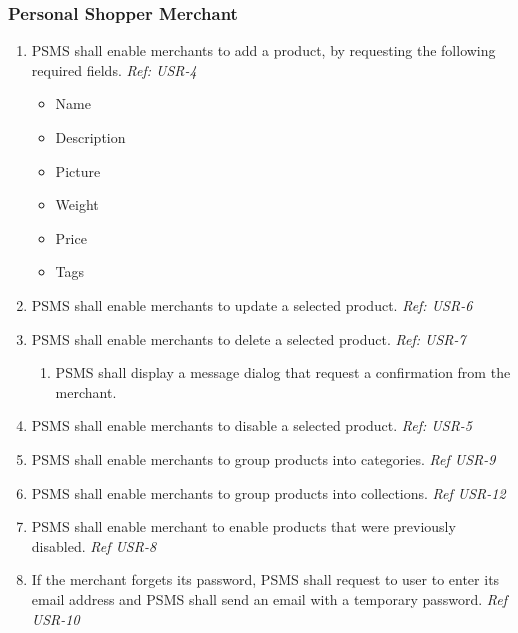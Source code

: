\subsubsection{Personal Shopper Merchant}
\begin{enumerate}[resume, label=SY-\arabic*]
    \item PSMS shall enable merchants to add a product, by requesting the 
    following required fields.
    \newline \textit{Ref: USR-4}
    \begin{itemize}
        \item Name
        \item Description
        \item Picture
        \item Weight
        \item Price 
        \item Tags
    \end{itemize}
    \item PSMS shall enable merchants to update a selected product.
    \newline \textit{Ref: USR-6}
    \item PSMS shall enable merchants to delete a selected product.
    \newline \textit{Ref: USR-7}
    \begin{enumerate}[label=SY-24.\arabic*]
        \item PSMS shall display a message dialog that request a confirmation 
        from the merchant.
    \end{enumerate}
    \item PSMS shall enable merchants to disable a selected product.
    \newline \textit{Ref: USR-5}
    \item PSMS shall enable merchants to group products into categories. 
    \newline \textit{Ref USR-9}
    \item PSMS shall enable merchants to group products into collections. 
    \newline \textit{Ref USR-12} 
    \item PSMS shall enable merchant to enable products that were 
    previously disabled.
    \newline \textit{Ref USR-8} 
    \item If the merchant forgets its password, PSMS shall request to user 
    to enter its email address and PSMS shall send an email with a 
    temporary password.
    \newline \textit{Ref USR-10} 
\end{enumerate}

